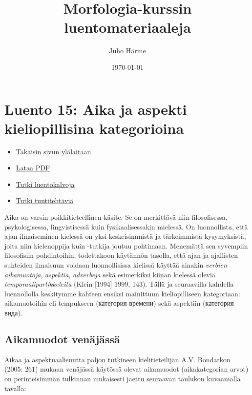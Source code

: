 \documentclass[]{scrartcl}
\author{Juho Härme}
\title{Morfologia-kurssin luentomateriaaleja}
\date{\today}
\providecommand{\tightlist}{%
  \setlength{\itemsep}{0pt}\setlength{\parskip}{0pt}}
\begin{document}
\maketitle
\tableofcontents
\newpage



\section{Luento 15: Aika ja aspekti kieliopillisina
kategorioina}\label{luento-15-aika-ja-aspekti-kieliopillisina-kategorioina}

\begin{itemize}
\tightlist
\item
  \href{https://mustikka.uta.fi/~juho_harme/morfologia/\#tästä-kurssista}{Takaisin
  sivun ylälaitaan}
\item
  \href{http://mustikka.uta.fi/~juho_harme/morfologia/materiaalit/luento15.pdf}{Lataa
  PDF}
\item
  \href{http://mustikka.uta.fi/~juho_harme/morfologia/presentations/luento15.html}{Tutki
  luentokalvoja}
\item
  \href{http://mustikka.uta.fi/~juho_harme/morfologia/tehtavat/luento15.pdf}{Tutki
  tuntitehtäviä}
\end{itemize}

Aika on varsin poikkitieteellinen käsite. Se on merkittävä niin
filosofisessa, psykologisessa, lingvistisessä kuin fysikaalisessakin
mielessä. On luonnollista, että ajan ilmaiseminen kielessä on yksi
keskeisimmistä ja tärkeimmistä kysymyksistä, joita niin kielenoppija
kuin -tutkija joutuu pohtimaan. Menemättä sen syvempiin filosofisiin
pohdintoihin, todettakoon käytännön tasolla, että ajan ja ajallisten
suhteiden ilmaisuun voidaan luonnollisissa kielissä käyttää ainakin
\emph{verbien aikamuotoja}, \emph{aspektia}, \emph{adverbeja} sekä
esimerkiksi kiinan kielessä olevia \emph{temporaalipartikkeleita} (Klein
{[}1994{]} 1999, 143). Tällä ja seuraavilla kahdella luennollolla
keskitymme kahteen ensiksi mainittuun kieliopilliseen kategoriaan:
aikamuotoihin eli tempukseen (категория времени) sekä aspektiin
(категория вида).

\subsection{Aikamuodot venäjässä}\label{aikamuodot-venuxe4juxe4ssuxe4}

Aikaa ja aspektuaalisuutta paljon tutkineen kielitieteilijän A.V.
Bondarkon (2005: 261) mukaan venäjässä käytössä olevat aikamuodot
(aikakategorian arvot) on perinteisimmän tulkinnan mukaisesti jaettu
seuraavan taulukon kuvaamalla tavalla:
\end{document}
